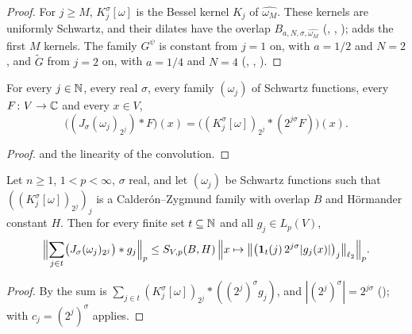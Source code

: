 \begin{proof}
\leanok
For $j \geq M$, $K^\sigma_j[\omega]$ is the Bessel kernel $K_j$ of $\widehat{\omega_M}$. These
kernels are uniformly Schwartz, and their dilates have the overlap
$B_{a,N,\sigma,\widehat{\omega_M}}$ (,
, );  adds the
first $M$ kernels. The family $G^{\psi}$ is constant from $j = 1$ on, with $a = 1/2$ and
$N = 2$, and $\tilde G$ from $j = 2$ on, with $a = 1/4$ and $N = 4$ (,
, ).
\end{proof}

\begin{lemma}
\label{lem:bessel-dilate-convolution}
\leanok
{}
For every $j \in \mathbb{N}$, every real $\sigma$, every family $(\omega_j)$ of Schwartz functions,
every $F \colon V \to \mathbb{C}$ and every $x \in V$,
\[
  \bigl( (J_\sigma (\omega_j)_{2^j}) * F \bigr)(x)
  = \bigl( (K^\sigma_j[\omega])_{2^j} * (2^{j\sigma} F) \bigr)(x) .
\]
\end{lemma}

\begin{proof}
\leanok
{} and the linearity of the convolution.
\end{proof}

\begin{theorem}
\label{thm:bessel-synthesis-bound}
\leanok
{}
Let $n \geq 1$, $1 < p < \infty$, $\sigma$ real, and let $(\omega_j)$ be Schwartz functions such
that $((K^\sigma_j[\omega])_{2^j})_j$ is a Calder\'on--Zygmund family with overlap $B$ and
H\"ormander constant $H$. Then for every finite set $t \subseteq \mathbb{N}$ and all $g_j \in L_p(V)$,
\[
  \Bigl\| \sum_{j \in t} \bigl(J_\sigma (\omega_j)_{2^j}\bigr) * g_j \Bigr\|_p
  \leq S_{V,p}(B, H) \, \Bigl\| x \mapsto \bigl\| \bigl(\mathbf 1_t(j) \, 2^{j\sigma}
  |g_j(x)|\bigr)_j \bigr\|_{\ell_2} \Bigr\|_p .
\]
\end{theorem}

\begin{proof}
\leanok
By  the sum is
$\sum_{j \in t} (K^\sigma_j[\omega])_{2^j} * ((2^j)^\sigma g_j)$, and $|(2^j)^\sigma| = 2^{j\sigma}$
();  with
$c_j = (2^j)^\sigma$ applies.
\end{proof}

